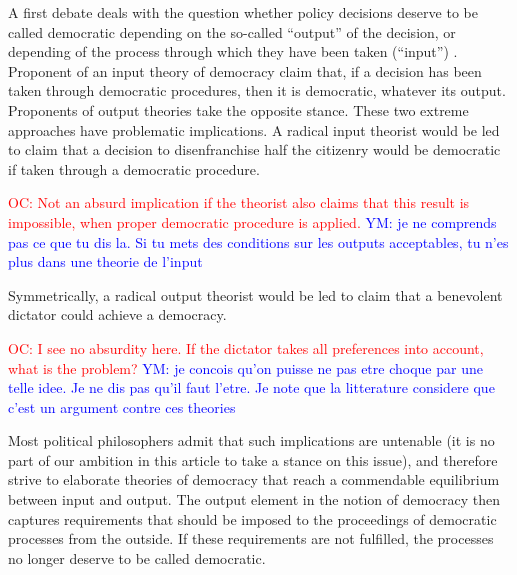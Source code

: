 \documentclass[preprint,11pt]{elsarticle}
\newcommand{\commentYM}[1]{\textcolor{blue}{YM: #1}}
\newcommand{\commentOC}[1]{\textcolor{red}{OC: #1}}
\begin{document}
A first debate deals with the question whether policy decisions deserve to be called democratic depending on the so-called “output” of the decision, or depending of the process through which they have been taken (“input”) \cite{vatn_environmental_2016, backstrand_environmental_2010}. Proponent of an input theory of democracy claim that, if a decision has been taken through democratic procedures, then it is democratic, whatever its output. Proponents of output theories take the opposite stance. These two extreme approaches have problematic implications. A radical input theorist would be led to claim that a decision to disenfranchise half the citizenry would be democratic if taken through a democratic procedure. 

\commentOC{Not an absurd implication if the
theorist also claims that this result is impossible, when
proper democratic procedure is applied.}
\commentYM{je ne comprends pas ce que tu dis la. Si tu mets des conditions sur les outputs acceptables, tu n'es plus dans une theorie de l'input}

Symmetrically, a radical output theorist would be led to claim that a benevolent dictator could achieve a democracy. 

\commentOC{ I see no absurdity here. If the
dictator takes all preferences into account, what is the
problem?
}
\commentYM{je concois qu'on puisse ne pas etre choque par une telle idee. Je ne dis pas qu'il faut l'etre. Je note que la litterature considere que c'est un argument contre ces theories}

Most political philosophers admit that such implications are untenable (it is no part of our ambition in this article to take a stance on this issue), and therefore strive to elaborate theories of democracy that reach a commendable equilibrium between input and output. The output element in the notion of democracy then captures requirements that should be imposed to the proceedings of democratic processes from the outside. If these requirements are not fulfilled, the processes no longer deserve to be called democratic. %
\end{document}

